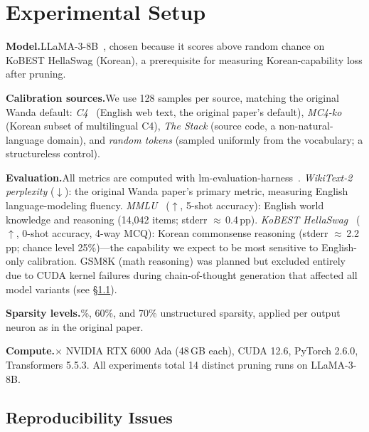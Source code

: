 \documentclass{article}
\begin{document}
\section{Experimental Setup}
\label{sec:setup}

\textbf{Model.}\quad LLaMA-3-8B~\citep{grattafiori2024llama3}, chosen because it scores above random chance on KoBEST HellaSwag (Korean), a prerequisite for measuring Korean-capability loss after pruning.

\textbf{Calibration sources.}\quad We use 128 samples per source, matching the original Wanda default:
\emph{C4}~\citep{raffel2020t5} (English web text, the original paper's default),
\emph{MC4-ko} (Korean subset of multilingual C4),
\emph{The Stack} (source code, a non-natural-language domain),
and \emph{random tokens} (sampled uniformly from the vocabulary; a structureless control).

\textbf{Evaluation.}\quad All metrics are computed with lm-evaluation-harness~\citep{gao2024lmeval}.
\emph{WikiText-2 perplexity} ($\downarrow$): the original Wanda paper's primary metric, measuring English language-modeling fluency.
\emph{MMLU}~\citep{hendrycks2021mmlu} ($\uparrow$, 5-shot accuracy): English world knowledge and reasoning (14,042 items; stderr $\approx$\,0.4\,pp).
\emph{KoBEST HellaSwag}~\citep{jang2022kobest} ($\uparrow$, 0-shot accuracy, 4-way MCQ): Korean commonsense reasoning (stderr $\approx$\,2.2\,pp; chance level 25\%)---the capability we expect to be most sensitive to English-only calibration.
GSM8K (math reasoning) was planned but excluded entirely due to CUDA kernel failures during chain-of-thought generation that affected all model variants (see \S\ref{sec:repro}).

\textbf{Sparsity levels.}\%, 60\%, and 70\% unstructured sparsity, applied per output neuron as in the original paper.

\textbf{Compute.}$\times$ NVIDIA RTX 6000 Ada (48\,GB each), CUDA 12.6, PyTorch 2.6.0, Transformers 5.5.3.
All experiments total 14 distinct pruning runs on LLaMA-3-8B.

\subsection{Reproducibility Issues}
\label{sec:repro}
\end{document}
